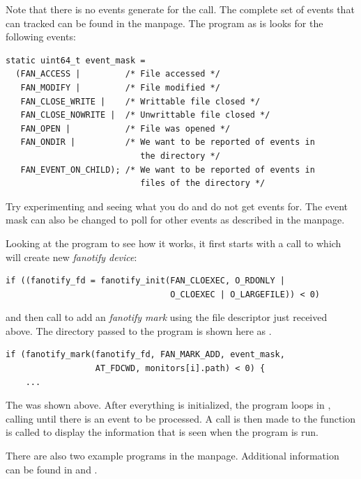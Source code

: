 \noindent
Note that there is no events generate for the  call. The complete set of events that can tracked can be found in the  manpage. The program as is looks for the following events:

\begin{lstlisting}
static uint64_t event_mask =
  (FAN_ACCESS |         /* File accessed */
   FAN_MODIFY |         /* File modified */
   FAN_CLOSE_WRITE |    /* Writtable file closed */
   FAN_CLOSE_NOWRITE |  /* Unwrittable file closed */
   FAN_OPEN |           /* File was opened */
   FAN_ONDIR |          /* We want to be reported of events in 
                           the directory */
   FAN_EVENT_ON_CHILD); /* We want to be reported of events in 
                           files of the directory */
\end{lstlisting}

\noindent
Try experimenting and seeing what you do and do not get events for. The event mask can also be changed to poll for other events as described in the  manpage.

Looking at the program to see how it works, it first starts with a call to  which will create new \textit{fanotify device}:

\begin{lstlisting}
if ((fanotify_fd = fanotify_init(FAN_CLOEXEC, O_RDONLY | 
                                 O_CLOEXEC | O_LARGEFILE)) < 0)
\end{lstlisting}

\noindent
and then call  to add an \textit{fanotify mark} using the file descriptor just received above. The directory passed to the program is shown here as .

\begin{lstlisting}
if (fanotify_mark(fanotify_fd, FAN_MARK_ADD, event_mask,
                  AT_FDCWD, monitors[i].path) < 0) { 
    ...
\end{lstlisting}

\noindent
The  was shown above. After everything is initialized, the program loops in , calling  until there is an event to be processed. A call is then made to the function  is called to display the information that is seen when the program is run.

There are also two example programs in the  manpage. Additional information can be found in  and .

